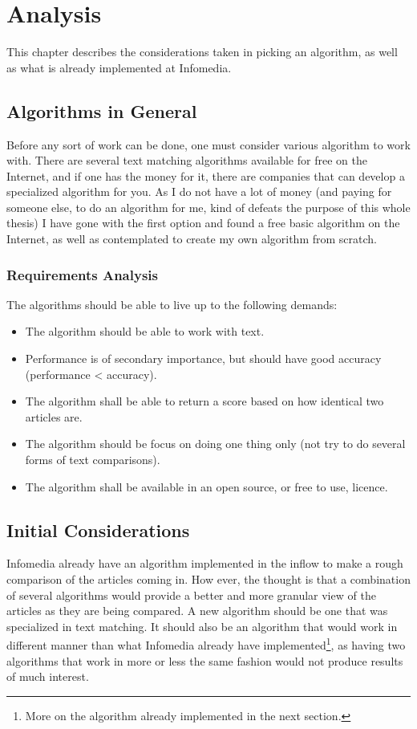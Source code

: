 \chapter{Analysis}

This chapter describes the considerations taken in picking an algorithm, as well as what is already implemented at Infomedia.

\section{Algorithms in General}
Before any sort of work can be done, one must consider various algorithm to work with. There are several text matching algorithms available for free on the Internet, and if one has the money for it, there are companies that can develop a specialized algorithm for you. As I do not have a lot of money (and paying for someone else, to do an algorithm for me, kind of defeats the purpose of this whole thesis) I have gone with the first option and found a free basic algorithm on the Internet, as well as contemplated to create my own algorithm from scratch.

\subsection{Requirements Analysis}
The algorithms should be able to live up to the following demands:

\begin{itemize}
	\item The algorithm should be able to work with text.
	\item Performance is of secondary importance, but should have good accuracy (performance < accuracy).
	\item The algorithm shall be able to return a score based on how identical two articles are.
	\item The algorithm should be focus on doing one thing only (not try to do several forms of text comparisons).
	\item The algorithm shall be available in an open source, or free to use, licence.
\end{itemize}

\section{Initial Considerations}
Infomedia already have an algorithm implemented in the inflow to make a rough comparison of the articles coming in. How ever, the thought is that a combination of several algorithms would provide a better and more granular view of the articles as they are being compared. A new algorithm should be one that was specialized in text matching. It should also be an algorithm that would work in different manner than what Infomedia already have implemented\footnote{More on the algorithm already implemented in the next section.}, as having two algorithms that work in more or less the same fashion would not produce results of much interest.

